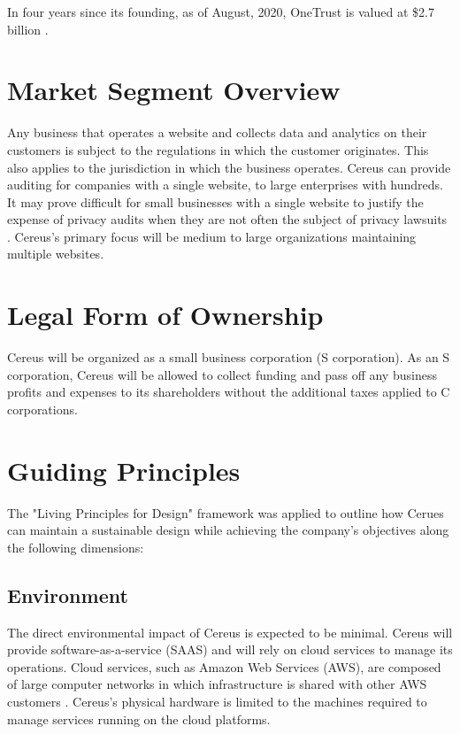 In four years since its founding, as of August, 2020, OneTrust is valued at \$2.7 billion \cite{hughes.iapp.2020}.

\section{Market Segment Overview}

Any business that operates a website and collects data and analytics on their customers is subject to the regulations in which the customer originates. This also applies to the jurisdiction in which the business operates. Cereus can provide auditing for companies with a single website, to large enterprises with hundreds. It may prove difficult for small businesses with a single website to justify the expense of privacy audits when they are not often the subject of privacy lawsuits \cite{lanou.2020}. Cereus's primary focus will be medium to large organizations maintaining multiple websites. 


\section{Legal Form of Ownership}

Cereus will be organized as a small business corporation (S corporation). As an S corporation, Cereus will be allowed to collect funding and pass off any business profits and expenses to its shareholders without the additional taxes applied to C corporations.

\section{Guiding Principles}

The "Living Principles for Design" framework \cite{brink.aiga.2020} was applied to outline how Cerues can maintain a sustainable design while achieving the company's objectives along the following dimensions:

\subsection{Environment}

The direct environmental impact of Cereus is expected to be minimal. Cereus will provide software-as-a-service (SAAS) and will rely on cloud services to manage its operations. Cloud services, such as Amazon Web Services (AWS), are composed of large computer networks in which infrastructure is shared with other AWS customers \cite{aws.2020}. Cereus's physical hardware is limited to the machines required to manage services running on the cloud platforms.

